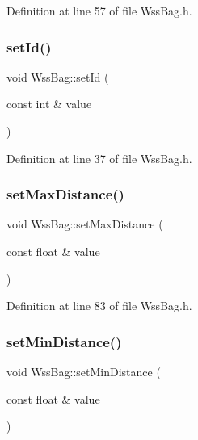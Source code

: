Definition at line 57 of file Wss\+Bag.\+h.

\mbox{\label{class_wss_bag_a0e2859dfdb070ff7a8fe0c5ba4135af7}} 
\subsubsection{\texorpdfstring{set\+Id()}{setId()}}
{\footnotesize\ttfamily void Wss\+Bag\+::set\+Id (\begin{DoxyParamCaption}\item[{const int \&}]{value }\end{DoxyParamCaption})\hspace{0.3cm}{\ttfamily [inline]}}



Definition at line 37 of file Wss\+Bag.\+h.

\mbox{\label{class_wss_bag_aa8d3109ab823231b0001ceeca68e1a2b}} 
\subsubsection{\texorpdfstring{set\+Max\+Distance()}{setMaxDistance()}}
{\footnotesize\ttfamily void Wss\+Bag\+::set\+Max\+Distance (\begin{DoxyParamCaption}\item[{const float \&}]{value }\end{DoxyParamCaption})\hspace{0.3cm}{\ttfamily [inline]}}



Definition at line 83 of file Wss\+Bag.\+h.

\mbox{\label{class_wss_bag_a5e55486287410b7b51cc31a8af115d58}} 
\subsubsection{\texorpdfstring{set\+Min\+Distance()}{setMinDistance()}}
{\footnotesize\ttfamily void Wss\+Bag\+::set\+Min\+Distance (\begin{DoxyParamCaption}\item[{const float \&}]{value }\end{DoxyParamCaption})\hspace{0.3cm}{\ttfamily [inline]}}



